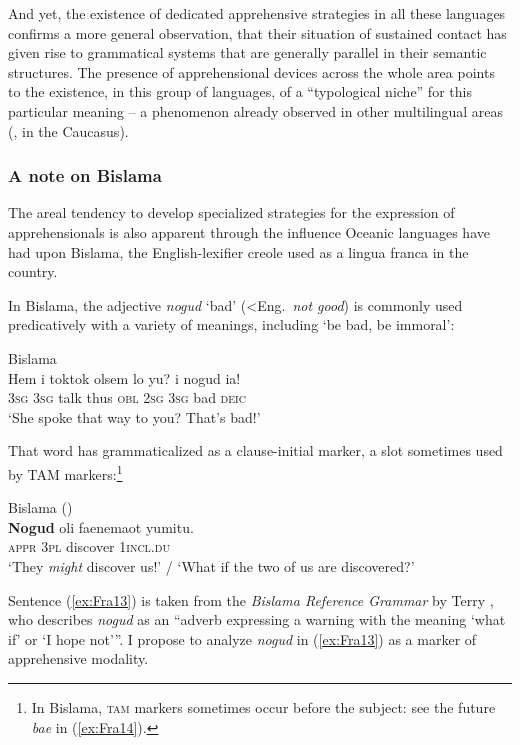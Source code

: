 \documentclass[output=paper,colorlinks,citecolor=brown]{langscibook}
\begin{document}
And yet, the existence of dedicated apprehensive strategies in all these languages confirms a more general observation, that their situation of sustained contact has given rise to grammatical systems that are generally parallel in their semantic structures. The presence of apprehensional devices across the whole area points to the existence, in this group of languages, of a ``typological niche'' for this particular meaning -- a phenomenon already observed in other multilingual areas (\citealt{chapters/daniel}, in the Caucasus). 



\subsubsection{A note on Bislama}
\label{subsubsec:bislama}

The areal tendency to develop specialized strategies for the expression of apprehensionals is also apparent through the influence Oceanic languages have had upon Bislama, the English-lexifier creole used as a lingua franca in the country. 

In Bislama, the adjective \textit{nogud} `bad' (<Eng.\ \textit{not good}) is commonly used predicatively with a variety of meanings, including `be bad, be immoral':
 
\ea \label{ex:Fra12} \textnormal{Bislama} \\
\gll Hem i toktok olsem lo yu? i nogud ia! \\
\textsc{3sg} \textsc{3sg} talk thus \textsc{obl} \textsc{2sg} \textsc{3sg} bad \textsc{deic} \\
\glt `She spoke that way to you? That's bad!'
\z

\noindent That word has grammaticalized as a clause-initial marker, a slot sometimes used by TAM markers:\footnote{In Bislama, \textsc{tam} markers sometimes occur before the subject: see the future \textit{bae} in (\ref{ex:Fra14}).} 

\ea \label{ex:Fra13} \textnormal{Bislama (\citealt[186]{Crowley2004})} \\
\gll \textbf{Nogud}  oli  faenemaot  yumitu. \\
\textsc{appr} \textsc{3pl} discover \textsc{1incl.du} \\
\glt `They \textit{might} discover us!' / `What if the two of us are discovered?' 
\z

\noindent Sentence (\ref{ex:Fra13}) is taken from the \textit{Bislama Reference Grammar} by Terry \citet{Crowley2004}, who describes \textit{nogud} as an ``adverb expressing a warning with the meaning `what if' or `I hope not'\textnormal{''}. I propose to analyze \textit{nogud} in (\ref{ex:Fra13}) as a marker of apprehensive modality.
\end{document}
